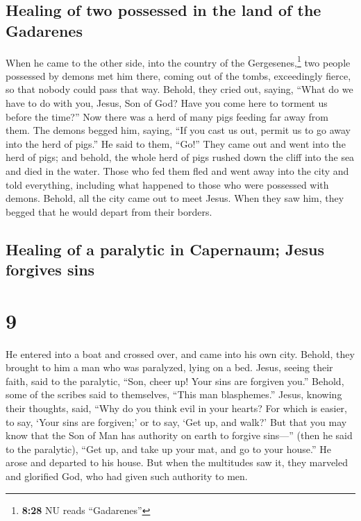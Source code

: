 \hypertarget{healing-of-two-possessed-in-the-land-of-the-gadarenes}{%
\subsection{Healing of two possessed in the land of the
Gadarenes}\label{healing-of-two-possessed-in-the-land-of-the-gadarenes}}

 When he came to the other side, into the country of the
Gergesenes,\footnote{\textbf{8:28} NU reads ``Gadarenes''} two people
possessed by demons met him there, coming out of the tombs, exceedingly
fierce, so that nobody could pass that way.  Behold, they
cried out, saying, ``What do we have to do with you, Jesus, Son of God?
Have you come here to torment us before the time?''  Now
there was a herd of many pigs feeding far away from them.
 The demons begged him, saying, ``If you cast us out,
permit us to go away into the herd of pigs.''  He said to
them, ``Go!'' They came out and went into the herd of pigs; and behold,
the whole herd of pigs rushed down the cliff into the sea and died in
the water.  Those who fed them fled and went away into
the city and told everything, including what happened to those who were
possessed with demons.  Behold, all the city came out to
meet Jesus. When they saw him, they begged that he would depart from
their borders.

\hypertarget{healing-of-a-paralytic-in-capernaum-jesus-forgives-sins}{%
\subsection{Healing of a paralytic in Capernaum; Jesus forgives
sins}\label{healing-of-a-paralytic-in-capernaum-jesus-forgives-sins}}

\hypertarget{section-8}{%
\section{9}\label{section-8}}

 He entered into a boat and crossed over, and came into
his own city.  Behold, they brought to him a man who was
paralyzed, lying on a bed. Jesus, seeing their faith, said to the
paralytic, ``Son, cheer up! Your sins are forgiven you.'' 
Behold, some of the scribes said to themselves, ``This man blasphemes.''
 Jesus, knowing their thoughts, said, ``Why do you think
evil in your hearts?  For which is easier, to say, `Your
sins are forgiven;' or to say, `Get up, and walk?'  But
that you may know that the Son of Man has authority on earth to forgive
sins---'' (then he said to the paralytic), ``Get up, and take up your
mat, and go to your house.''  He arose and departed to his
house.  But when the multitudes saw it, they marveled and
glorified God, who had given such authority to men.

